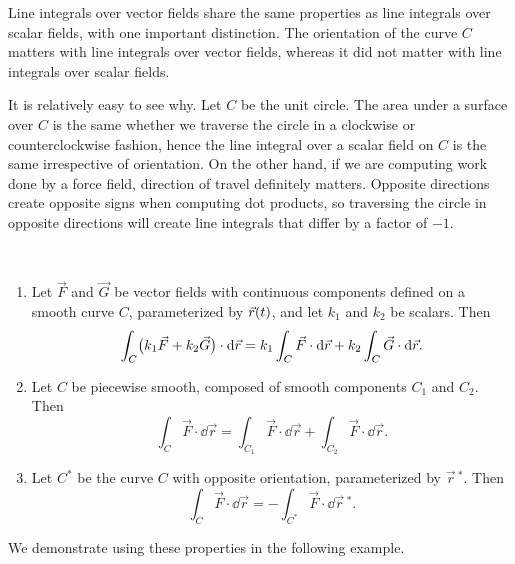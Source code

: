 Line integrals over vector fields share the same properties as line integrals over scalar fields, with one important distinction. The orientation of the curve $C$ matters with line integrals over vector fields, whereas it did not matter with line integrals over scalar fields.

It is relatively easy to see why. Let $C$ be the unit circle. The area under a surface over $C$ is the same whether we traverse the circle in a clockwise or counterclockwise fashion, hence the line integral over a scalar field on $C$ is the same irrespective of orientation. On the other hand, if we are computing work done by a force field, direction of travel definitely matters. Opposite directions create opposite signs when computing dot products, so traversing the circle in opposite directions will create line integrals that differ by a factor of $-1$. 

\begin{theorem}\label{thm:line_int_properties_vector}%
\mbox{}\\[-2\baselineskip]\parbox[t]{\linewidth}{%
\begin{enumerate}
	\item	Let $\vec F$ and $\vec G$ be  vector fields with continuous components defined on a smooth curve $C$, parameterized by $\vec r(t)$, and let $k_1$ and $k_2$ be scalars. Then
	\[
	\displaystyle \int_C\bigl(k_1\vec F+k_2\vec G\bigr)\cdot\operatorname{d}\!\vec r
	= k_1\int_C\vec F\cdot\operatorname{d}\!\vec r +k_2\int_C\vec G\cdot\operatorname{d}\!\vec r.
	\]
	\item Let $C$ be piecewise smooth, composed of smooth components $C_1$ and $C_2$. Then
	\[
	\int_C\vec F\cdot\dd\vec r
	= \int_{C_1}\vec F\cdot\dd\vec r + \int_{C_2}\vec F\cdot\dd\vec r.
	\]
	\item	Let $C^*$ be the curve $C$ with opposite orientation, parameterized by $\vec r\,^*$. Then
	\[\int_C\vec F\cdot\dd\vec r = -\int_{C^*}\vec F\cdot\dd\vec r\,^*.\]
	\end{enumerate}}
\end{theorem}

We demonstrate using these properties in the following example.

